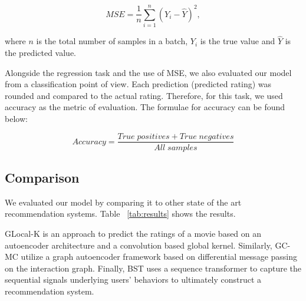 \documentclass{bioinfo}
\begin{document}
\begin{equation} \label{mse_equation}
MSE = \frac{1}{n}\sum_{i=1}^{n} (Y_i - \hat{Y})^2,
\end{equation}

where {${n}$} is the total number of samples in a batch, {${Y_i}$} is the true value and {${\hat{Y}}$} is the predicted value.

Alongside the regression task and the use of MSE, we also evaluated our model from a classification point of view. Each prediction (predicted rating) was rounded and compared to the actual rating. Therefore, for this task, we used accuracy as the metric of evaluation. The formulae for accuracy can be found below:

\begin{equation} \label{accuracy_equation}
Accuracy = \frac{True\;positives + True\;negatives}{All\;samples}
\end{equation}

\subsection{Comparison}

We evaluated our model by comparing it to other state of the art recommendation systems. Table ~\ref{tab:results} shows the results.

GLocal-K \citep{han2021glocal} is an approach to predict the ratings of a movie based on an autoencoder architecture and a convolution based global kernel. Similarly, GC-MC \citep{berg2017graph} utilize a graph autoencoder framework based on differential message passing on the interaction graph. Finally, BST \citep{chen2019behavior} uses a sequence transformer to capture the sequential signals underlying users’ behaviors to ultimately construct a recommendation system.
\end{document}
